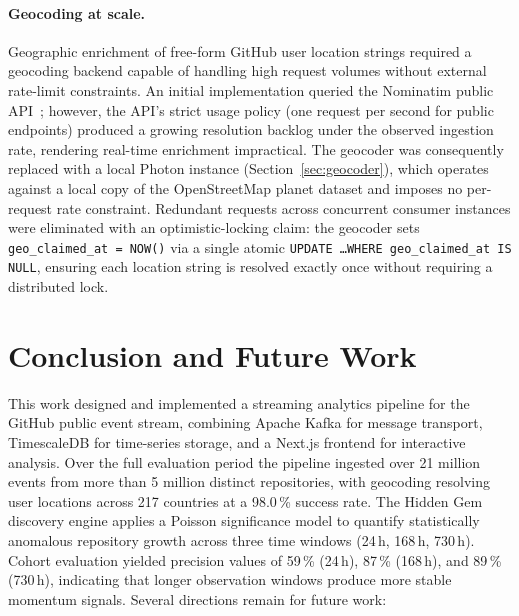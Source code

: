 \documentclass[sigconf]{acmart}
\begin{document}
\paragraph{Geocoding at scale.}
Geographic enrichment of free-form GitHub user location strings required a
geocoding backend capable of handling high request volumes without external
rate-limit constraints. An initial implementation queried the Nominatim
public API~\cite{nominatim}; however, the API's strict usage policy (one
request per second for public endpoints) produced a growing resolution backlog
under the observed ingestion rate, rendering real-time enrichment
impractical. The geocoder was consequently replaced with a local Photon
instance (Section~\ref{sec:geocoder}), which operates against a local copy
of the OpenStreetMap planet dataset and imposes no per-request rate
constraint. Redundant requests across concurrent consumer instances were
eliminated with an optimistic-locking claim: the geocoder sets
\texttt{geo\_claimed\_at = NOW()} via a single atomic
\texttt{UPDATE \ldots WHERE geo\_claimed\_at IS NULL}, ensuring each location
string is resolved exactly once without requiring a distributed lock.

\newpage

\section{Conclusion and Future Work}
\label{sec:conclusion}

This work designed and implemented a streaming analytics pipeline for the
GitHub public event stream, combining Apache Kafka for message transport,
TimescaleDB for time-series storage, and a Next.js frontend for interactive
analysis. Over the full evaluation period the pipeline ingested over 21 million
events from more than 5 million distinct repositories, with geocoding resolving
user locations across 217 countries at a 98.0\,\% success rate. The Hidden Gem
discovery engine applies a Poisson significance model to quantify statistically
anomalous repository growth across three time windows (24\,h, 168\,h, 730\,h).
Cohort evaluation yielded precision values of 59\,\% (24\,h), 87\,\% (168\,h),
and 89\,\% (730\,h), indicating that longer observation windows produce more
stable momentum signals.
Several directions remain for future work:
\end{document}
